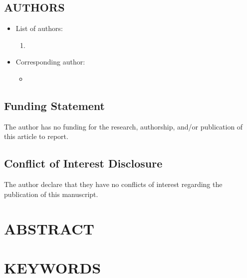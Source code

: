 \documentclass[12pt,english]{article}
\begin{document}
\subsection*{AUTHORS}
\begin{itemize}[label={}, leftmargin=*]
    \item List of authors:
    \begin{enumerate}
        \item \AUTHORHADAHINFO
    \end{enumerate}
    \item Corresponding author:
    \begin{itemize}
        \item \textbf{\AUTHORHADAHINFO}
    \end{itemize}
\end{itemize}

\subsection*{Funding Statement}

The author has no funding for the research, authorship, and/or publication of this article to report.

\subsection*{Conflict of Interest Disclosure}
The author declare that they have no conflicts of interest regarding the publication of this manuscript.

\clearpage 

\doublespacing
\section*{ABSTRACT}
\PAPERABSTRACT
\clearpage 

\doublespacing
\section*{KEYWORDS}
\PAPERKEYWORDS
\clearpage 
\end{document}
